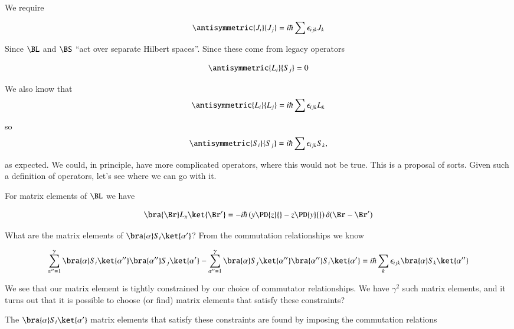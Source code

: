 We require

\begin{equation}\label{eqn:qmTwoL13:210}
\antisymmetric{J_i}{J_j} = i \hbar \sum \epsilon_{i j k} J_k
\end{equation}

Since $\BL$ and $\BS$ ``act over separate Hilbert spaces''.   Since these come from legacy operators

\begin{equation}\label{eqn:qmTwoL13:230}
\antisymmetric{L_i}{S_j} = 0
\end{equation}

We also know that
\begin{equation}\label{eqn:qmTwoL13:250}
\antisymmetric{L_i}{L_j} = i \hbar \sum \epsilon_{i j k} L_k
\end{equation}

so
\begin{equation}\label{eqn:qmTwoL13:270}
\antisymmetric{S_i}{S_j} = i \hbar \sum \epsilon_{i j k} S_k, 
\end{equation}

as expected.  We could, in principle, have more complicated operators, where this would not be true.  This is a proposal of sorts.  Given such a definition of operators, let's see where we can go with it.

For matrix elements of $\BL$ we have

\begin{equation}\label{eqn:qmTwoL13:290}
\bra{\Br} L_x \ket{\Br'} = -i \hbar \left( 
y \PD{z}{}
-z \PD{y}{} \right) \delta(\Br- \Br')
\end{equation}

What are the matrix elements of $\bra{\alpha} S_i \ket{\alpha'}$?  From the commutation relationships we know

\begin{equation}\label{eqn:qmTwoL13:310}
\sum_{\alpha'' = 1}^\gamma 
\bra{\alpha} S_i \ket{\alpha''}
\bra{\alpha''} S_j \ket{\alpha'}
-
\sum_{\alpha'' = 1}^\gamma 
\bra{\alpha} S_j \ket{\alpha''}
\bra{\alpha''} S_i \ket{\alpha'}
=
i \hbar \sum_k \epsilon_{ijk} 
\bra{\alpha} S_k \ket{\alpha''}
\end{equation}

We see that our matrix element is tightly constrained by our choice of commutator relationships.  We have $\gamma^2$ such matrix elements, and it turns out that it is possible to choose (or find) matrix elements that satisfy these constraints?

The $\bra{\alpha} S_i \ket{\alpha'}$ matrix elements that satisfy these constraints are found by imposing the commutation relations

